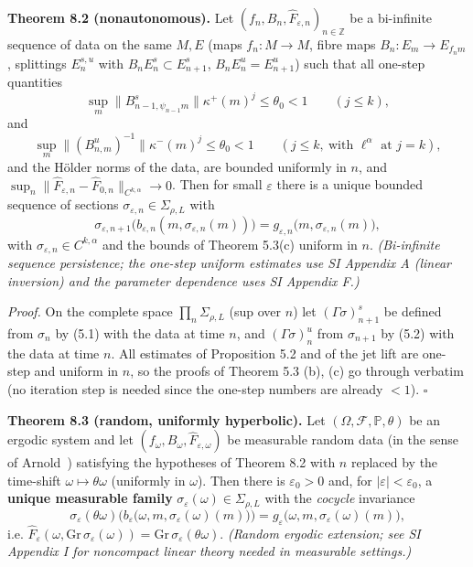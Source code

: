 \documentclass[11pt,a4paper]{article}
\theoremstyle{plain}
\theoremstyle{definition}
\theoremstyle{remark}
\numberwithin{equation}{section}
\numberwithin{figure}{section}
\begin{document}
\textbf{Theorem 8.2 (nonautonomous).} Let $(f_n,B_n,\widehat F_{\varepsilon,n})_{n\in\mathbb Z}$ be a bi-infinite sequence of data on the same $M,E$ (maps $f_n:M\to M$, fibre maps $B_n:E_m\to E_{f_nm}$, splittings $E^{s,u}_n$ with $B_nE^s_n\subset E^s_{n+1}$, $B_nE^u_n=E^u_{n+1}$) such that all one-step quantities
\[
\sup_m\|B^s_{n-1,\psi_{n-1}m}\|\kappa^+(m)^j\le\theta_0<1
\qquad (j\le k),
\]
and
\[
\sup_m\|(B^u_{n,m})^{-1}\|\kappa^-(m)^j\le\theta_0<1
\qquad (j\le k,\ \text{with }\ell^\alpha\text{ at }j=k),
\]
and the Hölder norms of the data, are bounded uniformly in $n$, and $\sup_n\|\widehat F_{\varepsilon,n}-\widehat F_{0,n}\|_{C^{k,\alpha}}\to0$. Then for small $\varepsilon$ there is a unique bounded sequence of sections $\sigma_{\varepsilon,n}\in\Sigma_{\rho,L}$ with
\[
\sigma_{\varepsilon,n+1}\big(b_{\varepsilon,n}(m,\sigma_{\varepsilon,n}(m))\big)=g_{\varepsilon,n}\big(m,\sigma_{\varepsilon,n}(m)\big),
\]
with $\sigma_{\varepsilon,n}\in C^{k,\alpha}$ and the bounds of Theorem 5.3(c) uniform in $n$. \textit{(Bi-infinite sequence persistence; the one-step uniform estimates use SI Appendix A (linear inversion) and the parameter dependence uses SI Appendix F.)}

\textit{Proof.} On the complete space $\prod_n\Sigma_{\rho,L}$ (sup over $n$) let $(\Gamma\sigma)^s_{n+1}$ be defined from $\sigma_n$ by (5.1) with the data at time $n$, and $(\Gamma\sigma)^u_n$ from $\sigma_{n+1}$ by (5.2) with the data at time $n$. All estimates of Proposition 5.2 and of the jet lift are one-step and uniform in $n$, so the proofs of Theorem 5.3 (b), (c) go through verbatim (no iteration step is needed since the one-step numbers are already $<1$). $\square$

\textbf{Theorem 8.3 (random, uniformly hyperbolic).} Let $(\Omega,\mathcal F,\mathbb P,\theta)$ be an ergodic system and let $(f_\omega,B_\omega,\widehat F_{\varepsilon,\omega})$ be measurable random data (in the sense of Arnold~\cite{arn98}) satisfying the hypotheses of Theorem 8.2 with $n$ replaced by the time-shift $\omega\mapsto\theta\omega$ (uniformly in $\omega$). Then there is $\varepsilon_0>0$ and, for $|\varepsilon|<\varepsilon_0$, a \textbf{unique measurable family} $\sigma_\varepsilon(\omega)\in\Sigma_{\rho,L}$ with the \textit{cocycle} invariance
\[
\sigma_\varepsilon(\theta\omega)\Big(b_\varepsilon\big(\omega,m,\sigma_\varepsilon(\omega)(m)\big)\Big)=g_\varepsilon\big(\omega,m,\sigma_\varepsilon(\omega)(m)\big),
\]
i.e. $\widehat F_{\varepsilon}(\omega,\mathrm{Gr}\,\sigma_\varepsilon(\omega))=\mathrm{Gr}\,\sigma_\varepsilon(\theta\omega)$. \textit{(Random ergodic extension; see SI Appendix I for noncompact linear theory needed in measurable settings.)}
\end{document}
